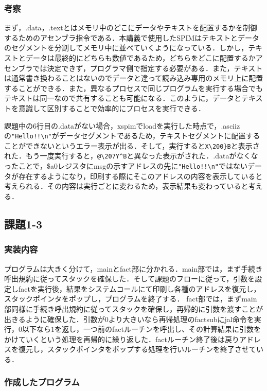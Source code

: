 \documentclass[a4j,11pt]{jarticle}
\begin{document}
  \subsubsection{考察}
  まず，.data，.textとはメモリ中のどこにデータやテキストを配置するかを制御するためのアセンブラ指令である．本講義で使用したSPIMはテキストとデータのセグメントを分割してメモリ中に並べていくようになっている．しかし，テキストとデータは最終的にどちらも数値であるため，どちらをどこに配置するかアセンブラでは決定できず，プログラマ側で指定する必要がある．また，テキストは通常書き換わることはないのでデータと違って読み込み専用のメモリ上に配置することができる．また，異なるプロセスで同じプログラムを実行する場合でもテキストは同一なので共有することも可能になる．このように，データとテキストを意識して区別することで効率的にプロセスを実行できる．

  課題中の6行目の.dataがない場合，xspimでloadを実行した時点で，.asciizの\verb|"Hello!!\n"|がデータセグメントであるため，テキストセグメントに配置することができないというエラー表示が出る．そして，実行すると\verb|X\200}B|と表示された．もう一度実行すると，\verb|@\207Y^B|と異なった表示がされた．.dataがなくなったことで，\$a0レジスタにmsgの示すアドレスの先に\verb|"Hello!!\n"|ではないデータが存在するようになり，印刷する際にそこのアドレスの内容を表示していると考えられる．その内容は実行ごとに変わるため，表示結果も変わっていると考える．
 \subsection{課題1-3}
  \subsubsection{実装内容}
  プログラムは大きく分けて，mainとfact部に分かれる．main部では，まず手続き呼出規約に従ってスタックを確保した．そして課題のフローに従って，引数を設定しfactを実行後，結果をシステムコールにて印刷し各種のアドレスを復元し，スタックポインタをポップし，プログラムを終了する．
fact部では，まずmain部同様に手続き呼出規約に従ってスタックを確保し，再帰的に引数を渡すことが出きるように確保した．引数が$0$より大きいなら再帰処理のfactsubにjal命令を実行，$0$以下なら$1$を返し，一つ前のfactルーチンを呼出し、その計算結果に引数をかけていくという処理を再帰的に繰り返した．factルーチン終了後は戻りアドレスを復元し，スタックポインタをポップする処理を行いルーチンを終了させている．
  \subsubsection{作成したプログラム}
  
\end{document}
